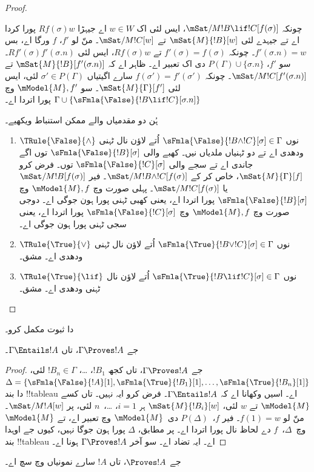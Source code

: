 \documentclass[../../../include/open-logic-section]{subfiles}
\begin{document}
\begin{proof}
\begin{enumerate}
  چونکہ $\mSat/{M}{!B \lif !C}[f(\sigma)]$، ایس لئی اک $w \in W$ اے
  جیہڑا $Rf(\sigma)w$ پورا کردا اے تے جیہدے لئی $\mSat{M}{!B}[w]$ تے
  $\mSat/{M}{!C}[w]$۔ منّ لو $f'$، $f$ ورگا اے، بس $f'(\sigma.n) = w$۔
  چونکہ $f'(\sigma) = f(\sigma)$ تے $Rf(\sigma)w$، ایس لئی
  $Rf'(\sigma)f'(\sigma.n)$۔ سو $f'$، $P(\Gamma) \cup \{\sigma.n\}$ دی
  اک تعبیر اے۔ ظاہر اے کہ $\mSat{M}{!B}[f'(\sigma.n)]$ تے
  $\mSat/{M}{!C}[f'(\sigma.n)]$۔ چونکہ $f(\sigma') = f'(\sigma')$
  سارے اگیتیاں $\sigma' \in P(\Gamma)$ لئی، ایس لئی $\mSat{M}{\Gamma}[f']$۔
  سو $\mModel{M}, f'$ وچ $\Gamma \cup \{\sFmla{\False}{!B \lif !C}[\sigma.n]\}$
  پورا اتردا اے۔
\end{enumerate}
ہُن دو مقدمیاں والے ممکن استنباط ویکھیے۔
\begin{enumerate}
\item $\TRule{\False}{\land}$ نوں $\sFmla{\False}{!B \land !C}[\sigma] \in \Gamma$
  اُتے لاؤن نال ٹہنی ودھدی اے تے دو ٹہنیاں ملدیاں نیں۔ کھبے والی
  $\sFmla{\False}{!B}[\sigma]$ توں اگے جاندی اے تے سجے والی
  $\sFmla{\False}{!C}[\sigma]$ توں۔ فرض کرو $\mSat{M}{\Gamma}[f]$،
  خاص کر کے $\mSat/{M}{!B \land !C}[f(\sigma)]$۔ فیر
  $\mSat/{M}{!B}[f(\sigma)]$ یا $\mSat/{M}{!C}[f(\sigma)]$۔
  پہلی صورت وچ $\mModel{M}, f$ وچ $\sFmla{\False}{!B}[\sigma]$ پورا
  اتردا اے، یعنی کھبی ٹہنی پورا ہون جوگی اے۔ دوجی صورت وچ
  $\mModel{M}, f$ وچ $\sFmla{\False}{!C}[\sigma]$ پورا اتردا اے،
  یعنی سجی ٹہنی پورا ہون جوگی اے۔
\item $\TRule{\True}{\lor}$ نوں $\sFmla{\True}{!B \lor !C}[\sigma] \in \Gamma$
  اُتے لاؤن نال ٹہنی ودھدی اے۔ مشق۔
\item $\TRule{\True}{\lif}$ نوں $\sFmla{\True}{!B \lif !C}[\sigma] \in \Gamma$
  اُتے لاؤن نال ٹہنی ودھدی اے۔ مشق۔
\end{enumerate}
\end{proof}

\begin{prob}
 دا ثبوت مکمل کرو۔
\end{prob}

\begin{cor}
جے $\Gamma \Proves !A$، تاں $\Gamma \Entails !A$۔
\end{cor}

\begin{proof}
  جے $\Gamma \Proves !A$، تاں کجھ $!B_1$، \dots، $!B_n \in \Gamma$ لئی،
  $\Delta = \{\sFmla{\False}{!A}[1], \sFmla{\True}{!B_1}[1],
  \dots, \sFmla{\True}{!B_n}[1]\}$ دا بند !!{tableau} اے۔ اسیں وکھانا اے
  کہ $\Gamma \Entails !A$۔ فرض کرو ایہ نہیں۔ تاں کسے $\mModel{M}$ تے $w$ لئی،
  $\mSat{M}{!B_i}[w]$ ہر $i=1$، \dots،~$n$ لئی، پر $\mSat/{M}{!A}[w]$۔
  منّ لو $f(1) = w$۔ فیر $f$،~$P(\Delta)$ دی~$\mModel{M}$ وچ تعبیر اے،
  تے $\mModel{M}$ وچ~$\Delta$،~$f$ دے لحاظ نال پورا اتردا اے۔
  پر  مطابق، $\Delta$ پورا ہون جوگا نہیں،
  کیوں جے اوہدا بند !!{tableau} اے۔ ایہ تضاد اے۔ سو آخر $\Gamma \Proves !A$ ہونا اے۔
\end{proof}

\begin{cor}
جے $\Proves !A$، تاں $!A$ سارے نمونیاں وچ سچ اے۔
\end{cor}
\end{document}
